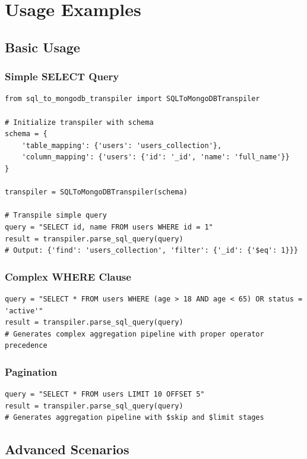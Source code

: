 \documentclass[12pt,a4paper]{article}
\begin{document}
\newpage

\section{Usage Examples}

\subsection{Basic Usage}

\subsubsection{Simple SELECT Query}
\begin{lstlisting}
from sql_to_mongodb_transpiler import SQLToMongoDBTranspiler

# Initialize transpiler with schema
schema = {
    'table_mapping': {'users': 'users_collection'},
    'column_mapping': {'users': {'id': '_id', 'name': 'full_name'}}
}

transpiler = SQLToMongoDBTranspiler(schema)

# Transpile simple query
query = "SELECT id, name FROM users WHERE id = 1"
result = transpiler.parse_sql_query(query)
# Output: {'find': 'users_collection', 'filter': {'_id': {'$eq': 1}}}
\end{lstlisting}

\subsubsection{Complex WHERE Clause}
\begin{lstlisting}
query = "SELECT * FROM users WHERE (age > 18 AND age < 65) OR status = 'active'"
result = transpiler.parse_sql_query(query)
# Generates complex aggregation pipeline with proper operator precedence
\end{lstlisting}

\subsubsection{Pagination}
\begin{lstlisting}
query = "SELECT * FROM users LIMIT 10 OFFSET 5"
result = transpiler.parse_sql_query(query)
# Generates aggregation pipeline with $skip and $limit stages
\end{lstlisting}

\subsection{Advanced Scenarios}
\end{document}
